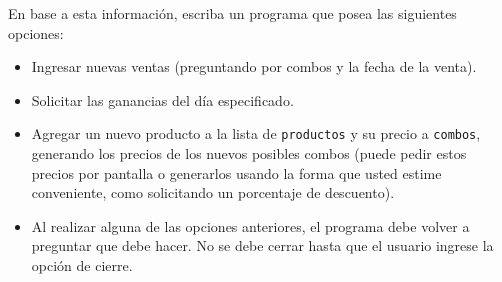 En base a esta información, escriba un programa que posea las siguientes opciones:
\begin{itemize}
    \item Ingresar nuevas ventas (preguntando por combos y la fecha de la venta).
    \item Solicitar las ganancias del día especificado.
    \item Agregar un nuevo producto a la lista de \texttt{productos} y su precio a \texttt{combos}, generando los precios de los nuevos posibles combos (puede pedir estos precios por pantalla o generarlos usando la forma que usted estime conveniente, como solicitando un porcentaje de descuento).
    \item Al realizar alguna de las opciones anteriores, el programa debe volver a preguntar que debe hacer. No se debe cerrar hasta que el usuario ingrese la opción de cierre.
\end{itemize} 

